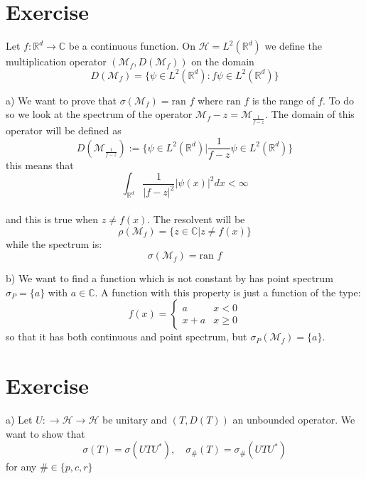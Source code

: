 \documentclass{article}
\newcommand{\R}{\mathbb{R}}
\newcommand{\C}{\mathbb{C}}
\newcommand{\M}{\mathcal{M}}
\begin{document}
\section{Exercise}
Let $f : \R^d \to \C$ be a continuous function. On $\mathcal{H} = L^2(\R^d)$ we define the multiplication operator $( \M_f, D(\M_f) )$ on the domain
\[
    D(\M_f) = \{ \psi \in L^2(\R^d) : f\psi \in L^2(\R^d) \}
\]

a) We want to prove that $\sigma(\M_f) = \mbox{ran }f$ where $\mbox{ran }f$ is the range of $f$. To do so we look at the spectrum of the operator $\M_f - z = \M_{\frac{1}{f-z}}$. The domain of this operator will be defined as 
\[
    D(\M_{\frac{1}{f-z}}) := \{ \psi \in L^2 (\R^d) | \frac{1}{f-z} \psi \in L^2(\R^d) \} 
\]
this means that \\
\[
    \int_{\R^d} \frac{1}{|f-z|^2} |\psi(x)|^2 dx < \infty
\]\\
and this is true when $z \neq f(x)$. The resolvent will be
\[
    \rho(\M_f) = \{ z\in \C | z \neq f(x) \}
\]
while the spectrum is:
\[
    \sigma(\M_f) = \mbox{ran }f
\]

b) We want to find a function which is not constant by has point spectrum $\sigma_P = \{ a \}$ with $a \in \C$. A function with this property is just a function of the type:
\[
    f(x) = \begin{cases}
        a & x<0\\
        x + a & x \geq 0 
    \end{cases}
\]
so that it has both continuous and point spectrum, but $\sigma_P(\M_f) = \{ a \}$.
\section{Exercise}
a) Let $U : \to \mathcal{H} \to \mathcal H $ be unitary and $(T, D(T))$ an unbounded operator. We want to show that 
\[
    \sigma(T) = \sigma(UTU^*), \quad \sigma_\#(T) = \sigma_\# (UTU^*)
\]
for any $\# \in \{ p,c,r \}$
\end{document}

